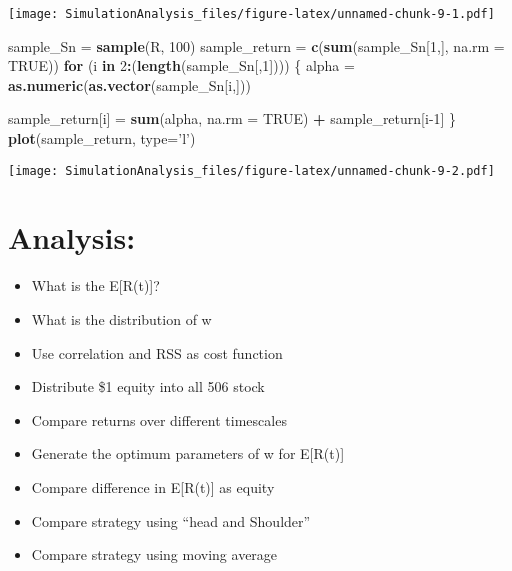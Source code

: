 \documentclass[
]{article}
\newenvironment{Shaded}{\begin{snugshade}}{\end{snugshade}}
\newcommand{\ControlFlowTok}[1]{\textcolor[rgb]{0.13,0.29,0.53}{\textbf{#1}}}
\newcommand{\DataTypeTok}[1]{\textcolor[rgb]{0.13,0.29,0.53}{#1}}
\newcommand{\DecValTok}[1]{\textcolor[rgb]{0.00,0.00,0.81}{#1}}
\newcommand{\KeywordTok}[1]{\textcolor[rgb]{0.13,0.29,0.53}{\textbf{#1}}}
\newcommand{\NormalTok}[1]{#1}
\newcommand{\OperatorTok}[1]{\textcolor[rgb]{0.81,0.36,0.00}{\textbf{#1}}}
\newcommand{\OtherTok}[1]{\textcolor[rgb]{0.56,0.35,0.01}{#1}}
\newcommand{\StringTok}[1]{\textcolor[rgb]{0.31,0.60,0.02}{#1}}
\providecommand{\tightlist}{%
  \setlength{\itemsep}{0pt}\setlength{\parskip}{0pt}}
\begin{document}
\texttt{[image: SimulationAnalysis\_files/figure-latex/unnamed-chunk-9-1.pdf]}

\begin{Shaded}
\begin{Highlighting}[]
\NormalTok{sample_Sn =}\StringTok{ }\KeywordTok{sample}\NormalTok{(R, }\DecValTok{100}\NormalTok{)}
\NormalTok{sample_return =}\StringTok{ }\KeywordTok{c}\NormalTok{(}\KeywordTok{sum}\NormalTok{(sample_Sn[}\DecValTok{1}\NormalTok{,], }\DataTypeTok{na.rm =} \OtherTok{TRUE}\NormalTok{))}
\ControlFlowTok{for}\NormalTok{ (i }\ControlFlowTok{in} \DecValTok{2}\OperatorTok{:}\NormalTok{(}\KeywordTok{length}\NormalTok{(sample_Sn[,}\DecValTok{1}\NormalTok{]))) \{}
\NormalTok{  alpha =}\StringTok{ }\KeywordTok{as.numeric}\NormalTok{(}\KeywordTok{as.vector}\NormalTok{(sample_Sn[i,]))}
  
\NormalTok{  sample_return[i] =}\StringTok{ }\KeywordTok{sum}\NormalTok{(alpha, }\DataTypeTok{na.rm =} \OtherTok{TRUE}\NormalTok{) }\OperatorTok{+}\StringTok{ }\NormalTok{sample_return[i}\DecValTok{-1}\NormalTok{]}
\NormalTok{\}}
\KeywordTok{plot}\NormalTok{(sample_return, }\DataTypeTok{type=}\StringTok{'l'}\NormalTok{)}
\end{Highlighting}
\end{Shaded}

\texttt{[image: SimulationAnalysis\_files/figure-latex/unnamed-chunk-9-2.pdf]}

\hypertarget{analysis}{%
\section{Analysis:}\label{analysis}}

\begin{itemize}
\tightlist
\item
  What is the E{[}R(t){]}?
\item
  What is the distribution of w
\item
  Use correlation and RSS as cost function
\item
  Distribute \$1 equity into all 506 stock
\item
  Compare returns over different timescales
\item
  Generate the optimum parameters of w for E{[}R(t){]}
\item
  Compare difference in E{[}R(t){]} as equity
\item
  Compare strategy using ``head and Shoulder''
\item
  Compare strategy using moving average
\end{itemize}
\end{document}
